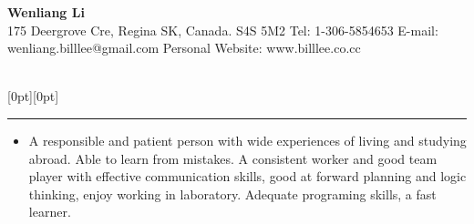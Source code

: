 \documentclass[letterpaper,12pt]{letter}
\begin{document}
\newcommand{\secb}{ ~\\[-15mm]}

\newcommand{\parab}{ ~\\[-8mm]}


%
% 

\begin{center}
\textbf{\Huge Wenliang Li} \\[3mm]
\textrm{\normalsize 175 Deergrove Cre, Regina} \linebreak
\textrm{\normalsize SK, Canada. S4S 5M2} \linebreak
\textrm{\normalsize Tel: 1-306-5854653} \linebreak
\textrm{\normalsize E-mail: wenliang.billlee@gmail.com} \linebreak
\textrm{\normalsize Personal Website: www.billlee.co.cc}
\end{center}

~\\[-20mm]


\raisebox{0pt}[0pt][0pt]{\Large\textbf{\raisebox{-3.5ex}{Profile}}}
\\[2mm]
\rule[-0.5cm]{10cm}{1pt}
\begin{itemize}
\item \textrm{\normalsize A responsible and patient person with wide experiences of living and studying abroad. Able to learn from mistakes. A consistent worker and good team player with effective communication skills, good at forward planning and logic thinking, enjoy working in laboratory. Adequate programing skills, a fast learner.}
\end{itemize} 
\end{document}

